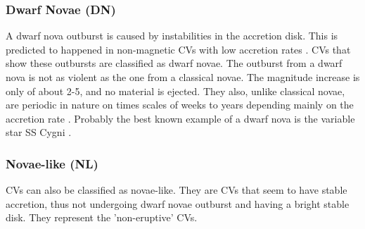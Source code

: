 
\subsubsection{Dwarf Novae (DN)}

A dwarf nova outburst is caused by instabilities in the accretion disk. This is predicted to happened in non-magnetic CVs with low accretion rates \citep{osaki_accretion_1974}. CVs that show these outbursts are classified as dwarf novae. The outburst from a dwarf nova is not as violent as the one from a classical novae. The magnitude increase is only of about 2-5, and no material is ejected. They also, unlike classical novae, are periodic in nature on times scales of weeks to years depending mainly on the accretion rate \citep{shara_recent_1989}. Probably the best known example of a dwarf nova is the variable star SS Cygni \citep[e.g.][for a review]{cannizzo_study_1998}. 

\subsubsection{Novae-like (NL)}

CVs can also be classified as novae-like. They are CVs that seem to have stable accretion, thus not undergoing dwarf novae outburst and having a bright stable disk. They represent the 'non-eruptive' CVs.



